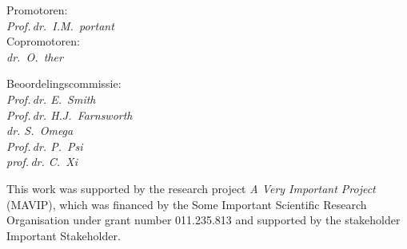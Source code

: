 \begin{titlepage}
\begin{center}
        \vspace*{2\bigskipamount}

\end{center}







\clearpage

\thispagestyle{empty}



Promotoren: \\[\medskipamount]    
        \textit{Prof.\,dr.\ I.M.~portant}  \\[\medskipamount]     

Copromotoren: \\[\medskipamount] 
        \textit{dr.\ O.~ther}  \\[\medskipamount]

\vspace*{2\bigskipamount}



Beoordelingscommissie: \\[\medskipamount]      
        \textit{Prof.\,dr. E.~Smith}  \\[\medskipamount]   
        \textit{Prof.\,dr. H.J.~Farnsworth} \\[\medskipamount]
        \textit{dr. S.~Omega} \\[\medskipamount]
        \textit{Prof.\,dr. P.~Psi}  \\[\medskipamount]
        \textit{prof.\,dr. C.~Xi} \\[\medskipamount]




\vfill

\vspace*{2\bigskipamount}

\noindent This work was supported by the research project \emph{A Very Important Project} (MAVIP), which was financed by the Some Important Scientific Research Organisation under grant number 011.235.813 and supported by the stakeholder Important Stakeholder.


\end{titlepage}

